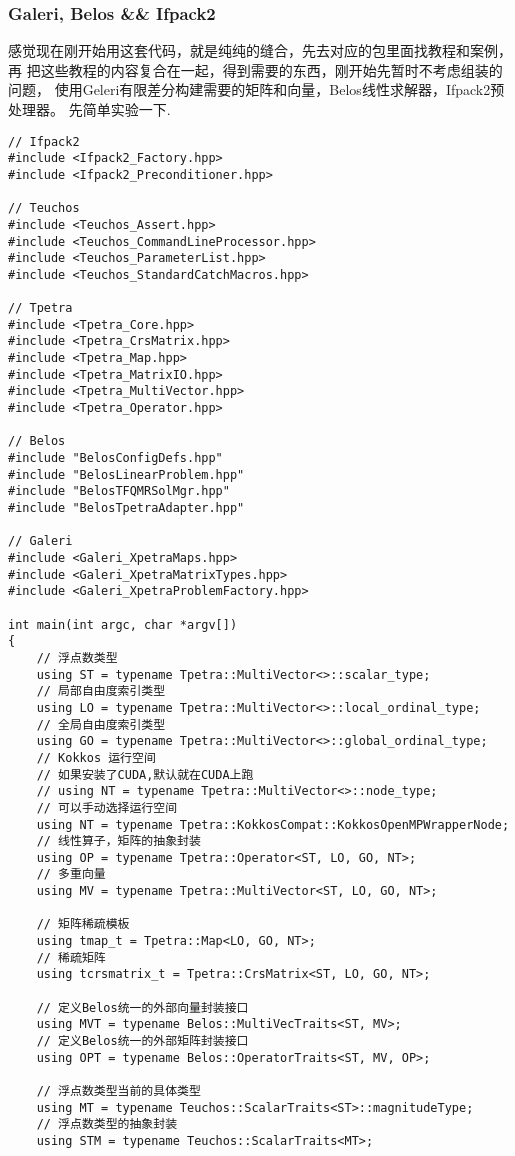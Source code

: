 \subsubsection{Galeri, Belos \&\& Ifpack2}
感觉现在刚开始用这套代码，就是纯纯的缝合，先去对应的包里面找教程和案例，再
把这些教程的内容复合在一起，得到需要的东西，刚开始先暂时不考虑组装的问题，
使用Geleri有限差分构建需要的矩阵和向量，Belos线性求解器，Ifpack2预处理器。
先简单实验一下.
\begin{lstlisting}
// Ifpack2
#include <Ifpack2_Factory.hpp>
#include <Ifpack2_Preconditioner.hpp>

// Teuchos
#include <Teuchos_Assert.hpp>
#include <Teuchos_CommandLineProcessor.hpp>
#include <Teuchos_ParameterList.hpp>
#include <Teuchos_StandardCatchMacros.hpp>

// Tpetra
#include <Tpetra_Core.hpp>
#include <Tpetra_CrsMatrix.hpp>
#include <Tpetra_Map.hpp>
#include <Tpetra_MatrixIO.hpp>
#include <Tpetra_MultiVector.hpp>
#include <Tpetra_Operator.hpp>

// Belos
#include "BelosConfigDefs.hpp"
#include "BelosLinearProblem.hpp"
#include "BelosTFQMRSolMgr.hpp"
#include "BelosTpetraAdapter.hpp"

// Galeri
#include <Galeri_XpetraMaps.hpp>
#include <Galeri_XpetraMatrixTypes.hpp>
#include <Galeri_XpetraProblemFactory.hpp>

int main(int argc, char *argv[])
{
    // 浮点数类型
    using ST = typename Tpetra::MultiVector<>::scalar_type;
    // 局部自由度索引类型
    using LO = typename Tpetra::MultiVector<>::local_ordinal_type;
    // 全局自由度索引类型
    using GO = typename Tpetra::MultiVector<>::global_ordinal_type;
    // Kokkos 运行空间
    // 如果安装了CUDA,默认就在CUDA上跑
    // using NT = typename Tpetra::MultiVector<>::node_type;
    // 可以手动选择运行空间
    using NT = typename Tpetra::KokkosCompat::KokkosOpenMPWrapperNode;
    // 线性算子，矩阵的抽象封装
    using OP = typename Tpetra::Operator<ST, LO, GO, NT>;
    // 多重向量
    using MV = typename Tpetra::MultiVector<ST, LO, GO, NT>;

    // 矩阵稀疏模板
    using tmap_t = Tpetra::Map<LO, GO, NT>;
    // 稀疏矩阵
    using tcrsmatrix_t = Tpetra::CrsMatrix<ST, LO, GO, NT>;

    // 定义Belos统一的外部向量封装接口
    using MVT = typename Belos::MultiVecTraits<ST, MV>;
    // 定义Belos统一的外部矩阵封装接口
    using OPT = typename Belos::OperatorTraits<ST, MV, OP>;

    // 浮点数类型当前的具体类型
    using MT = typename Teuchos::ScalarTraits<ST>::magnitudeType;
    // 浮点数类型的抽象封装
    using STM = typename Teuchos::ScalarTraits<MT>;


\end{lstlisting}
